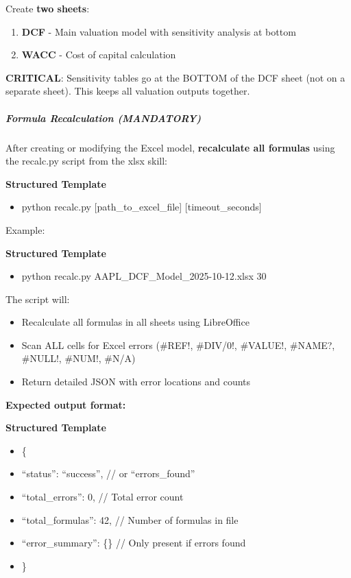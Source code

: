 \documentclass[11pt]{article}
\begin{document}
Create \textbf{two sheets}:


\begin{enumerate}[leftmargin=*,itemsep=2pt,topsep=2pt]
\item {} \textbf{DCF} - Main valuation model with sensitivity analysis at bottom
\item {} \textbf{WACC} - Cost of capital calculation
\end{enumerate}

\textbf{CRITICAL}: Sensitivity tables go at the BOTTOM of the DCF sheet (not on a separate sheet). This keeps all valuation outputs together.


\subparagraph{Formula Recalculation (MANDATORY)}\mbox{}\par

After creating or modifying the Excel model, \textbf{recalculate all formulas} using the recalc.py script from the xlsx skill:


\textbf{Structured Template}
\begin{itemize}[leftmargin=*,itemsep=2pt,topsep=2pt]
\item {} python recalc.py [path\_\allowbreak{}to\_\allowbreak{}excel\_\allowbreak{}file] [timeout\_\allowbreak{}seconds]
\end{itemize}

Example:

\textbf{Structured Template}
\begin{itemize}[leftmargin=*,itemsep=2pt,topsep=2pt]
\item {} python recalc.py AAPL\_\allowbreak{}DCF\_\allowbreak{}Model\_\allowbreak{}2025-10-12.xlsx 30
\end{itemize}

The script will:

\begin{itemize}[leftmargin=*,itemsep=2pt,topsep=2pt]
\item {} Recalculate all formulas in all sheets using LibreOffice
\item {} Scan ALL cells for Excel errors (\#REF!, \#DIV/0!, \#VALUE!, \#NAME?, \#NULL!, \#NUM!, \#N/A)
\item {} Return detailed JSON with error locations and counts
\end{itemize}

\textbf{Expected output format:}

\textbf{Structured Template}
\begin{itemize}[leftmargin=*,itemsep=2pt,topsep=2pt]
\item {} \{
\item {} ``status'': ``success'', // or ``errors\_\allowbreak{}found''
\item {} ``total\_\allowbreak{}errors'': 0, // Total error count
\item {} ``total\_\allowbreak{}formulas'': 42, // Number of formulas in file
\item {} ``error\_\allowbreak{}summary'': \{\} // Only present if errors found
\item {} \}
\end{itemize}
\end{document}
